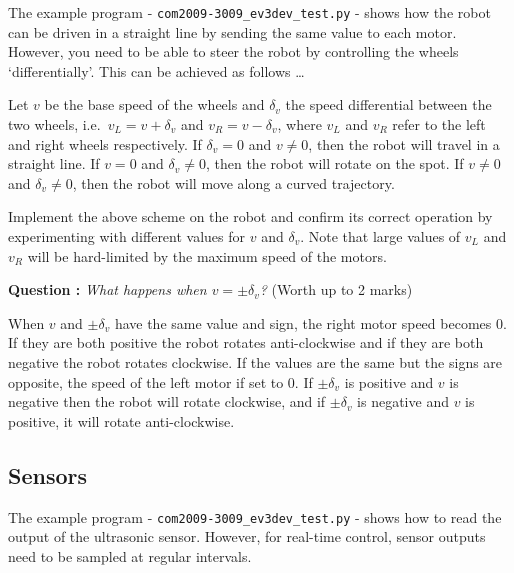 \documentclass[hidelinks,a4paper,11pt]{article}
\newcounter{question}
\newcommand\myq{\refstepcounter{question}\thequestion}
\begin{document}
The example program - \texttt{com2009-3009\_ev3dev\_test.py} - shows how the robot can be driven in a straight line by sending the same value to each motor.  However, you need to be able to steer the robot by controlling the wheels `differentially'.  This can be achieved as follows \ldots

Let $v$ be the base speed of the wheels and $\delta_{v}$ the speed differential between the two wheels, i.e.\ $v_{L} = v + \delta_{v}$ and $v_{R} = v - \delta_{v}$, where  $v_{L}$ and  $v_{R}$ refer to the left and right wheels respectively.  If $\delta_{v} =0$ and $v\neq0$, then the robot will travel in a straight line.  If $v=0$ and $\delta_{v}\neq0$, then the robot will rotate on the spot.  If $v\neq0$ and $\delta_{v}\neq0$, then the robot will move along a curved trajectory.

\begin{todolist}
	\item Implement the above scheme on the robot and confirm its correct operation by experimenting with different values for $v$ and $\delta_{v}$.    Note that large values of $v_{L}$ and $v_{R}$ will be hard-limited by the maximum speed of the motors.
\end{todolist}

{\bfseries Question \myq:}  \emph{What happens when $v=\pm\delta_{v}$?} (Worth up to 2 marks)\\
\begin{mdframed}
When $v$ and  $\pm\delta_{v}$ have the same value and sign, the right motor speed becomes 0.  If they are both positive the robot rotates anti-clockwise and if they are both negative the robot rotates clockwise.  If the values are the same but the signs are opposite, the speed of the left motor if set to 0.  If $\pm\delta_{v}$ is positive and $v$ is negative then the robot will rotate clockwise, and if $\pm\delta_{v}$  is negative and $v$ is positive, it will rotate anti-clockwise.
\end{mdframed}
\vspace*{\baselineskip}


\subsection{Sensors}

The example program - \texttt{com2009-3009\_ev3dev\_test.py} - shows how to read the output of the ultrasonic sensor.  However, for real-time control, sensor outputs need to be sampled at regular intervals.
\end{document}
